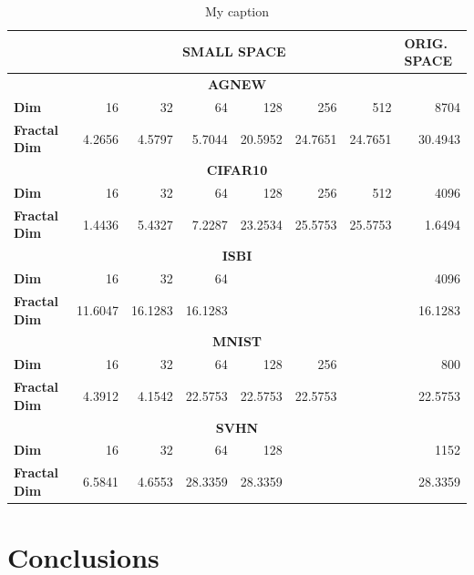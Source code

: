 \documentclass{article}
\begin{document}
\begin{table}[ht]
\centering
\caption{My caption}
\label{my-label}
\begin{tabular}{|l|r|r|r|r|r|r|r|}
\hline
                     & \multicolumn{6}{c|}{\textbf{SMALL SPACE}}                 & \multicolumn{1}{l|}{\textbf{ORIG. SPACE}} \\ \hline
\multicolumn{8}{|c|}{\textbf{AGNEW}}                                                                                         \\ \hline
\textbf{Dim}         & 16      & 32      & 64      & 128     & 256     & 512     & 8704                                      \\ \hline
\textbf{Fractal Dim} & 4.2656  & 4.5797  & 5.7044  & 20.5952 & 24.7651 & 24.7651 & 30.4943                                   \\ \hline
\multicolumn{8}{|c|}{\textbf{CIFAR10}}                                                                                       \\ \hline
\textbf{Dim}         & 16      & 32      & 64      & 128     & 256     & 512     & 4096                                      \\ \hline
\textbf{Fractal Dim} & 1.4436  & 5.4327  & 7.2287  & 23.2534 & 25.5753 & 25.5753 & 1.6494                                    \\ \hline
\multicolumn{8}{|c|}{\textbf{ISBI}}                                                                                          \\ \hline
\textbf{Dim}         & 16      & 32      & 64      &         &         &         & 4096                                      \\ \hline
\textbf{Fractal Dim} & 11.6047 & 16.1283 & 16.1283 &         &         &         & 16.1283                                   \\ \hline
\multicolumn{8}{|c|}{\textbf{MNIST}}                                                                                         \\ \hline
\textbf{Dim}         & 16      & 32      & 64      & 128     & 256     &         & 800                                       \\ \hline
\textbf{Fractal Dim} & 4.3912  & 4.1542  & 22.5753 & 22.5753 & 22.5753 &         & 22.5753                                   \\ \hline
\multicolumn{8}{|c|}{\textbf{SVHN}}                                                                                          \\ \hline
\textbf{Dim}         & 16      & 32      & 64      & 128     &         &         & 1152                                      \\ \hline
\textbf{Fractal Dim} & 6.5841  & 4.6553  & 28.3359 & 28.3359 &         &         & 28.3359                                   \\ \hline
\end{tabular}
\end{table}

\section{Conclusions}
 




\end{document}
